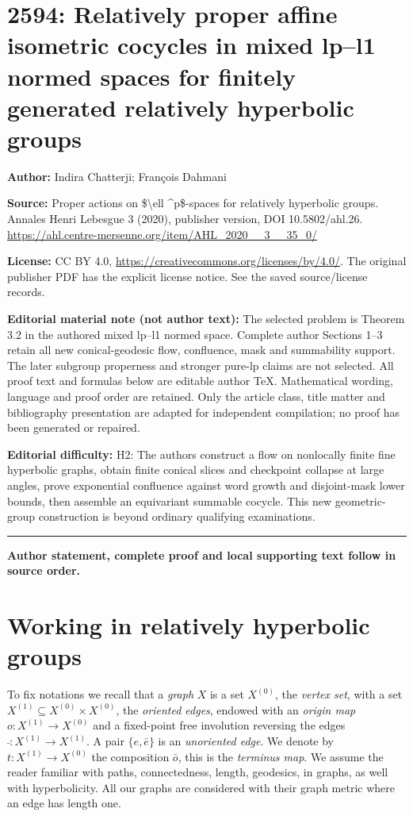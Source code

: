 \documentclass[11pt]{article}
\theoremstyle{definition}
\numberwithin{equation}{section}
\begin{document}
\section*{2594: Relatively proper affine isometric cocycles in mixed lp–l1 normed spaces for finitely generated relatively hyperbolic groups}
\noindent\textbf{Author:} Indira Chatterji; François Dahmani\par\noindent\textbf{Source:} Proper actions on \$\textbackslash{}ell \textasciicircum{}p\$-spaces for relatively hyperbolic groups. Annales Henri Lebesgue 3 (2020), publisher version, DOI 10.5802/ahl.26. \url{https://ahl.centre-mersenne.org/item/AHL_2020__3__35_0/}
\par\noindent\textbf{License:} CC BY 4.0, \url{https://creativecommons.org/licenses/by/4.0/}. The original publisher PDF has the explicit license notice. See the saved source/license records.
\par\noindent\textbf{Editorial material note (not author text):} The selected problem is Theorem 3.2 in the authored mixed lp--l1 normed space. Complete author Sections 1--3 retain all new conical-geodesic flow, confluence, mask and summability support. The later subgroup properness and stronger pure-lp claims are not selected. All proof text and formulas below are editable author TeX. Mathematical wording, language and proof order are retained. Only the article class, title matter and bibliography presentation are adapted for independent compilation; no proof has been generated or repaired.
\par\noindent\textbf{Editorial difficulty:} H2: The authors construct a flow on nonlocally finite fine hyperbolic graphs, obtain finite conical slices and checkpoint collapse at large angles, prove exponential confluence against word growth and disjoint-mask lower bounds, then assemble an equivariant summable cocycle. This new geometric-group construction is beyond ordinary qualifying examinations.
\medskip\hrule\medskip
\noindent\textbf{Author statement, complete proof and local supporting text follow in source order.}
\section{Working in relatively hyperbolic groups}\label{bases}

To fix notations we recall that a \emph{graph} $X$ is a set $X^{(0)}$, the \emph{vertex set}, with a set $X^{(1)}\subseteq X^{(0)}\times X^{(0)}$, the \emph{oriented edges}, endowed with an \emph{origin map} $o:X^{(1)} \to X^{(0)}$ and a fixed-point free involution reversing the edges $\bar{\ }: X^{(1)}\to X^{(1)}$. A pair $\{e,\bar e\}$ is an \emph{unoriented edge}. We denote by $t:X^{(1)} \to X^{(0)}$ the composition $\bar o$, this is the \emph{terminus map}. We assume the reader familiar with paths, connectedness, length, geodesics, in graphs, as well with hyperbolicity. All our graphs are considered with their graph metric where an edge has length one.
\end{document}
